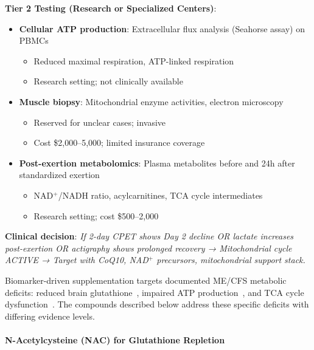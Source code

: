 \textbf{Tier 2 Testing (Research or Specialized Centers)}:
\begin{itemize}
    \item \textbf{Cellular ATP production}: Extracellular flux analysis (Seahorse assay) on PBMCs
    \begin{itemize}
        \item Reduced maximal respiration, ATP-linked respiration
        \item Research setting; not clinically available
    \end{itemize}

    \item \textbf{Muscle biopsy}: Mitochondrial enzyme activities, electron microscopy
    \begin{itemize}
        \item Reserved for unclear cases; invasive
        \item Cost \$2,000--5,000; limited insurance coverage
    \end{itemize}

    \item \textbf{Post-exertion metabolomics}: Plasma metabolites before and 24h after standardized exertion
    \begin{itemize}
        \item NAD$^+$/NADH ratio, acylcarnitines, TCA cycle intermediates
        \item Research setting; cost \$500--2,000
    \end{itemize}
\end{itemize}

\textbf{Clinical decision}: \textit{If 2-day CPET shows Day 2 decline OR lactate increases post-exertion OR actigraphy shows prolonged recovery → Mitochondrial cycle ACTIVE → Target with CoQ10, NAD$^+$ precursors, mitochondrial support stack.}

\begin{observation}
\label{obs:mito-support-stack}
Biomarker-driven supplementation targets documented ME/CFS metabolic deficits: reduced brain glutathione~\cite{Shungu2012glutathione}, impaired ATP production~\cite{keller2024cpet}, and TCA cycle dysfunction~\cite{Yamano2016tca_urea}. The compounds described below address these specific deficits with differing evidence levels.
\end{observation}

\paragraph{N-Acetylcysteine (NAC) for Glutathione Repletion}

